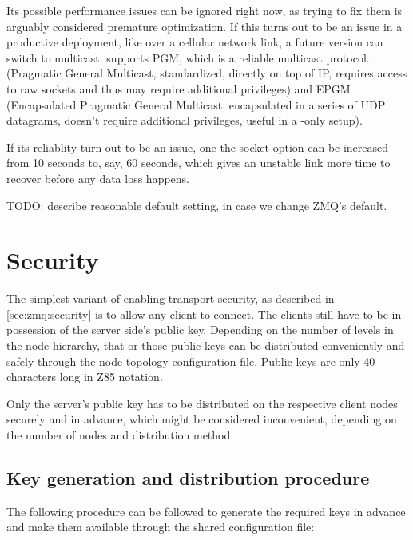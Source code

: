 Its possible performance issues can be ignored right now, as trying to fix them
is arguably considered premature optimization. If this turns out to be an issue
in a productive deployment, like over a cellular network link, a future version
can switch to multicast. \zmq supports PGM, which is a reliable multicast
protocol. (Pragmatic General Multicast, standardized, directly on top of IP,
requires access to raw sockets and thus may require additional privileges) and
EPGM (Encapsulated Pragmatic General Multicast, encapsulated in a series of UDP
datagrams, doesn't require additional privileges, useful in a \zmq-only setup).

If its reliablity turn out to be an issue, one the socket option
 can be increased from 10 seconds to, say, 60 seconds, which
gives an unstable link more time to recover before any data loss happens.

TODO: describe reasonable default setting, in case we change ZMQ's default.


\section{Security}\label{sec:approach:security}
The simplest variant of enabling transport security, as described in
\autoref{sec:zmq:security} is to allow any client to connect. The clients still
have to be in possession of the server side's public key. Depending on the
number of levels in the node hierarchy, that or those public keys can be
distributed conveniently and safely through the node topology configuration
file. Public keys are only 40 characters long in \gls{Z85} notation.

Only the server's public key has to be distributed on the respective client nodes
securely and in advance, which might be considered inconvenient, depending on
the number of nodes and distribution method.



\subsection{Key generation and distribution procedure}
The following procedure can be followed to generate the required keys in
advance and make them available through the shared configuration file:

